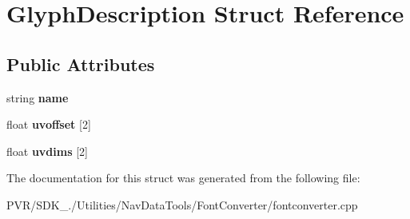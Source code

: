 \hypertarget{struct_glyph_description}{\section{Glyph\+Description Struct Reference}
\label{struct_glyph_description}
}
\subsection*{Public Attributes}
\begin{DoxyCompactItemize}
\item 
\hypertarget{struct_glyph_description_a5ff9291a675ee3f64d5f6dc73c17b04b}{string {\bfseries name}}\label{struct_glyph_description_a5ff9291a675ee3f64d5f6dc73c17b04b}

\item 
\hypertarget{struct_glyph_description_a0fe7843a55aaca41b98b86d932927a99}{float {\bfseries uvoffset} \mbox{[}2\mbox{]}}\label{struct_glyph_description_a0fe7843a55aaca41b98b86d932927a99}

\item 
\hypertarget{struct_glyph_description_aa61fecabba8b007271af6360f1dbc23f}{float {\bfseries uvdims} \mbox{[}2\mbox{]}}\label{struct_glyph_description_aa61fecabba8b007271af6360f1dbc23f}

\end{DoxyCompactItemize}


The documentation for this struct was generated from the following file\+:\begin{DoxyCompactItemize}
\item 
P\+V\+R/\+S\+D\+K\+\_./\+Utilities/\+Nav\+Data\+Tools/\+Font\+Converter/fontconverter.\+cpp\end{DoxyCompactItemize}
